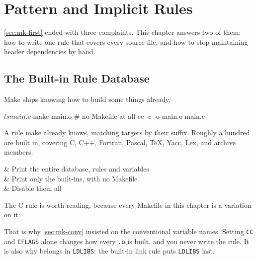 \chapter{Pattern and Implicit Rules}\label{ch:mk-patterns}

\autoref{sec:mk-first} ended with three complaints. This chapter answers two of
them: how to write one rule that covers every source file, and how to stop
maintaining header dependencies by hand.

\section{The Built-in Rule Database}\label{sec:mk-implicit}

Make ships knowing how to build some things already.

\begin{shell}
$ ls
main.c
$ make main.o                    # no Makefile at all
cc    -c -o main.o main.c
\end{shell}

\begin{definition}
	A rule make already knows, matching targets by their suffix. Roughly a hundred
	are built in, covering C, C++, Fortran, Pascal, \TeX{}, Yacc, Lex, and archive
	members.
\end{definition}

\begin{keys}[0.30]
	            & Print the entire database, rules and variables   \\
	 & Print only the built-ins, with no Makefile     \\
	            & Disable them all                                 \\
\end{keys}

The C rule is worth reading, because every Makefile in this chapter is a
variation on it:


\begin{note}
	That is why \autoref{sec:mk-conv} insisted on the conventional variable names.
	Setting \texttt{CC} and \texttt{CFLAGS} alone changes how every \texttt{.o} is
	built, and you never write the rule. It is also why  belongs in
	\texttt{LDLIBS}: the built-in link rule puts \texttt{LDLIBS} last.
\end{note}

